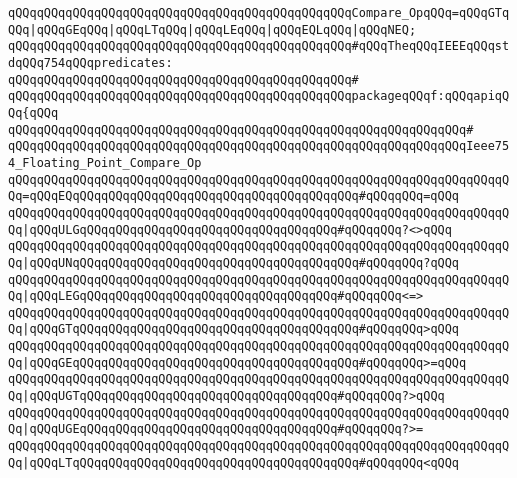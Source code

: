 \verb|qQQqqQQqqQQqqQQqqQQqqQQqqQQqqQQqqQQqqQQqqQQqqQQqCompare_OpqQQq=qQQqGTqQQq|\verb#|qQQqGEqQQq|qQQqLTqQQq|qQQqLEqQQq|qQQqEQLqQQq|qQQqNEQ;#\newline
\newline
\verb|qQQqqQQqqQQqqQQqqQQqqQQqqQQqqQQqqQQqqQQqqQQqqQQq#qQQqTheqQQqIEEEqQQqstdqQQq754qQQqpredicates:|\newline
\verb|qQQqqQQqqQQqqQQqqQQqqQQqqQQqqQQqqQQqqQQqqQQqqQQq#|\newline
\verb|qQQqqQQqqQQqqQQqqQQqqQQqqQQqqQQqqQQqqQQqqQQqqQQqpackageqQQqf:qQQqapiqQQq{qQQq|\newline
\verb|qQQqqQQqqQQqqQQqqQQqqQQqqQQqqQQqqQQqqQQqqQQqqQQqqQQqqQQqqQQqqQQq#|\newline
\verb|qQQqqQQqqQQqqQQqqQQqqQQqqQQqqQQqqQQqqQQqqQQqqQQqqQQqqQQqqQQqqQQqIeee754_Floating_Point_Compare_Op|\newline
\verb|qQQqqQQqqQQqqQQqqQQqqQQqqQQqqQQqqQQqqQQqqQQqqQQqqQQqqQQqqQQqqQQqqQQqqQQq=qQQqEQqQQqqQQqqQQqqQQqqQQqqQQqqQQqqQQqqQQqqQQq#qQQqqQQq=qQQq|\newline
\verb|qQQqqQQqqQQqqQQqqQQqqQQqqQQqqQQqqQQqqQQqqQQqqQQqqQQqqQQqqQQqqQQqqQQqqQQq|\verb#|qQQqULGqQQqqQQqqQQqqQQqqQQqqQQqqQQqqQQqqQQq#\verb|#qQQqqQQq?<>qQQq|\newline
\verb|qQQqqQQqqQQqqQQqqQQqqQQqqQQqqQQqqQQqqQQqqQQqqQQqqQQqqQQqqQQqqQQqqQQqqQQq|\verb#|qQQqUNqQQqqQQqqQQqqQQqqQQqqQQqqQQqqQQqqQQqqQQq#\verb|#qQQqqQQq?qQQq|\newline
\verb|qQQqqQQqqQQqqQQqqQQqqQQqqQQqqQQqqQQqqQQqqQQqqQQqqQQqqQQqqQQqqQQqqQQqqQQq|\verb#|qQQqLEGqQQqqQQqqQQqqQQqqQQqqQQqqQQqqQQqqQQq#\verb|#qQQqqQQq<=>|\newline
\verb|qQQqqQQqqQQqqQQqqQQqqQQqqQQqqQQqqQQqqQQqqQQqqQQqqQQqqQQqqQQqqQQqqQQqqQQq|\verb#|qQQqGTqQQqqQQqqQQqqQQqqQQqqQQqqQQqqQQqqQQqqQQq#\verb|#qQQqqQQq>qQQq|\newline
\verb|qQQqqQQqqQQqqQQqqQQqqQQqqQQqqQQqqQQqqQQqqQQqqQQqqQQqqQQqqQQqqQQqqQQqqQQq|\verb#|qQQqGEqQQqqQQqqQQqqQQqqQQqqQQqqQQqqQQqqQQqqQQq#\verb|#qQQqqQQq>=qQQq|\newline
\verb|qQQqqQQqqQQqqQQqqQQqqQQqqQQqqQQqqQQqqQQqqQQqqQQqqQQqqQQqqQQqqQQqqQQqqQQq|\verb#|qQQqUGTqQQqqQQqqQQqqQQqqQQqqQQqqQQqqQQqqQQq#\verb|#qQQqqQQq?>qQQq|\newline
\verb|qQQqqQQqqQQqqQQqqQQqqQQqqQQqqQQqqQQqqQQqqQQqqQQqqQQqqQQqqQQqqQQqqQQqqQQq|\verb#|qQQqUGEqQQqqQQqqQQqqQQqqQQqqQQqqQQqqQQqqQQq#\verb|#qQQqqQQq?>=|\newline
\verb|qQQqqQQqqQQqqQQqqQQqqQQqqQQqqQQqqQQqqQQqqQQqqQQqqQQqqQQqqQQqqQQqqQQqqQQq|\verb#|qQQqLTqQQqqQQqqQQqqQQqqQQqqQQqqQQqqQQqqQQqqQQq#\verb|#qQQqqQQq<qQQq|\newline

